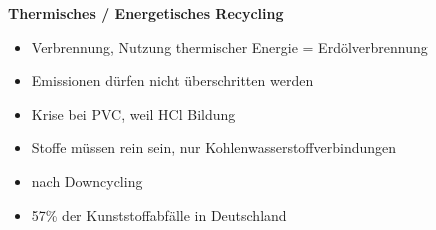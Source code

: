 \vspace{0.5cm}

\textbf{Thermisches / Energetisches Recycling}
\begin{itemize}
    \item Verbrennung, Nutzung thermischer Energie = Erdölverbrennung
    \item Emissionen dürfen nicht überschritten werden
    \item Krise bei PVC, weil HCl Bildung
    \item Stoffe müssen rein sein, nur Kohlenwasserstoffverbindungen
    \item nach Downcycling
    \item 57\% der Kunststoffabfälle in Deutschland
\end{itemize}
